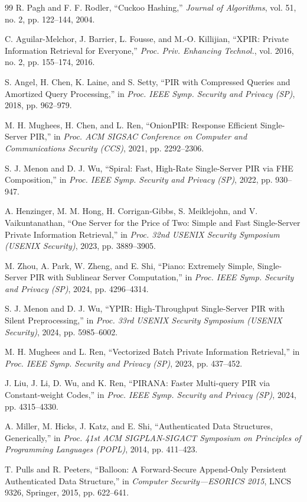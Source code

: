 \begin{thebibliography}{99}
R. Pagh and F. F. Rodler,
\newblock ``Cuckoo Hashing,''
\newblock \emph{Journal of Algorithms}, vol. 51, no. 2, pp. 122--144, 2004.

C. Aguilar-Melchor, J. Barrier, L. Fousse, and M.-O. Killijian,
\newblock ``XPIR: Private Information Retrieval for Everyone,''
\newblock \emph{Proc. Priv. Enhancing Technol.}, vol. 2016, no. 2, pp. 155--174, 2016.

S. Angel, H. Chen, K. Laine, and S. Setty,
\newblock ``PIR with Compressed Queries and Amortized Query Processing,''
\newblock in \emph{Proc. IEEE Symp. Security and Privacy (SP)}, 2018, pp. 962--979.

M. H. Mughees, H. Chen, and L. Ren,
\newblock ``OnionPIR: Response Efficient Single-Server PIR,''
\newblock in \emph{Proc. ACM SIGSAC Conference on Computer and Communications Security (CCS)}, 2021, pp. 2292--2306.

S. J. Menon and D. J. Wu,
\newblock ``Spiral: Fast, High-Rate Single-Server PIR via FHE Composition,''
\newblock in \emph{Proc. IEEE Symp. Security and Privacy (SP)}, 2022, pp. 930--947.

A. Henzinger, M. M. Hong, H. Corrigan-Gibbs, S. Meiklejohn, and V. Vaikuntanathan,
\newblock ``One Server for the Price of Two: Simple and Fast Single-Server Private Information Retrieval,''
\newblock in \emph{Proc. 32nd USENIX Security Symposium (USENIX Security)}, 2023, pp. 3889--3905.

M. Zhou, A. Park, W. Zheng, and E. Shi,
\newblock ``Piano: Extremely Simple, Single-Server PIR with Sublinear Server Computation,''
\newblock in \emph{Proc. IEEE Symp. Security and Privacy (SP)}, 2024, pp. 4296--4314.

S. J. Menon and D. J. Wu,
\newblock ``YPIR: High-Throughput Single-Server PIR with Silent Preprocessing,''
\newblock in \emph{Proc. 33rd USENIX Security Symposium (USENIX Security)}, 2024, pp. 5985--6002.

M. H. Mughees and L. Ren,
\newblock ``Vectorized Batch Private Information Retrieval,''
\newblock in \emph{Proc. IEEE Symp. Security and Privacy (SP)}, 2023, pp. 437--452.

J. Liu, J. Li, D. Wu, and K. Ren,
\newblock ``PIRANA: Faster Multi-query PIR via Constant-weight Codes,''
\newblock in \emph{Proc. IEEE Symp. Security and Privacy (SP)}, 2024, pp. 4315--4330.

A. Miller, M. Hicks, J. Katz, and E. Shi,
\newblock ``Authenticated Data Structures, Generically,''
\newblock in \emph{Proc. 41st ACM SIGPLAN-SIGACT Symposium on Principles of Programming Languages (POPL)}, 2014, pp. 411--423.

T. Pulls and R. Peeters,
\newblock ``Balloon: A Forward-Secure Append-Only Persistent Authenticated Data Structure,''
\newblock in \emph{Computer Security---ESORICS 2015}, LNCS 9326, Springer, 2015, pp. 622--641.

\end{thebibliography}

